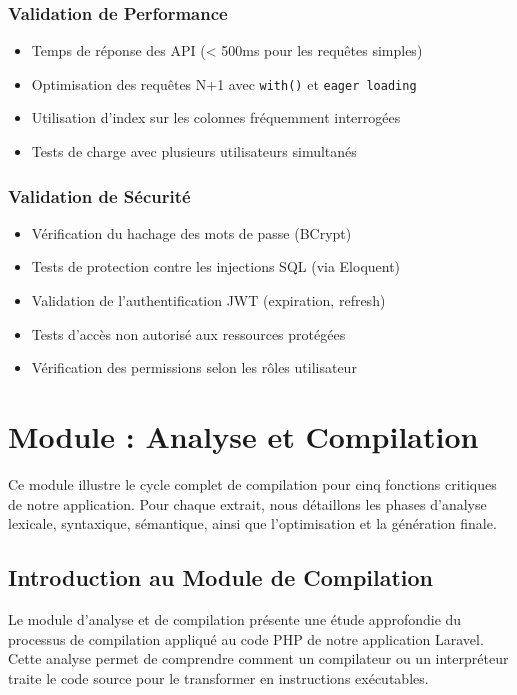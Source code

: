 \documentclass[12pt,a4paper]{report}
\begin{document}
\subsection{Validation de Performance}

\begin{itemize}
    \item Temps de réponse des API (< 500ms pour les requêtes simples)
    \item Optimisation des requêtes N+1 avec \texttt{with()} et \texttt{eager loading}
    \item Utilisation d'index sur les colonnes fréquemment interrogées
    \item Tests de charge avec plusieurs utilisateurs simultanés
\end{itemize}

\subsection{Validation de Sécurité}

\begin{itemize}
    \item Vérification du hachage des mots de passe (BCrypt)
    \item Tests de protection contre les injections SQL (via Eloquent)
    \item Validation de l'authentification JWT (expiration, refresh)
    \item Tests d'accès non autorisé aux ressources protégées
    \item Vérification des permissions selon les rôles utilisateur
\end{itemize}

\chapter{Module : Analyse et Compilation}

Ce module illustre le cycle complet de compilation pour cinq fonctions critiques de notre application. Pour chaque extrait, nous détaillons les phases d'analyse lexicale, syntaxique, sémantique, ainsi que l'optimisation et la génération finale.

\section{Introduction au Module de Compilation}

Le module d'analyse et de compilation présente une étude approfondie du processus de compilation appliqué au code PHP de notre application Laravel. Cette analyse permet de comprendre comment un compilateur ou un interpréteur traite le code source pour le transformer en instructions exécutables.
\end{document}
